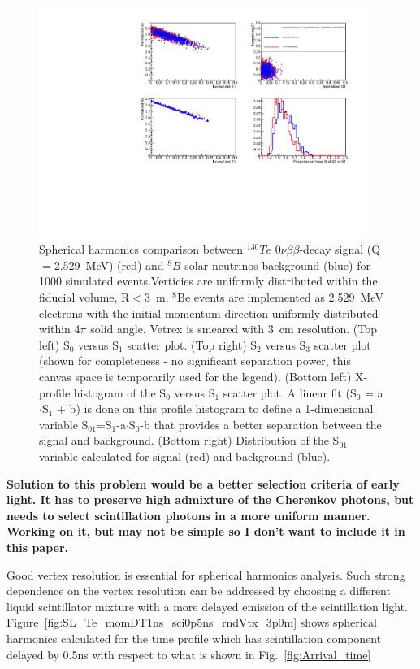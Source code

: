 \documentclass[12pt,twoside,letterpaper]{article}
\newcommand{\vbb}{0\nu\beta\beta}
\newcommand{\Te}{^{130}Te}
\newcommand{\B}{^{8}B}
\begin{document}
\begin{figure}[htb]
\centering
\includegraphics[angle=0,width=0.95\textwidth]{plots/hSLPlots_Te_allLight_VtxSmear3cm_VtxShiftX0cm_momDT1p0ns_rndVtx_3p0mSphere.pdf}
\caption{Spherical harmonics comparison between $\Te$ $\vbb$-decay signal (Q$=$2.529~MeV) (red) and $\B$ solar neutrinos background (blue) for 1000 simulated events.Verticies are uniformly distributed within the fiducial volume, R$<$3~m. $^8$Be events are implemented as 2.529~MeV electrons with the initial momentum direction uniformly distributed within 4$\pi$ solid angle. Vetrex is smeared with 3~cm resolution. (Top left) S$_0$ versus S$_1$ scatter plot. (Top right) S$_2$ versus S$_3$ scatter plot (shown for completeness - no significant separation power, this canvas space is temporarily used for the legend). (Bottom left) X-profile histogram of the S$_0$ versus S$_1$ scatter plot. A linear fit (S$_0$ = a$\cdot$S$_1$ + b) is done on this profile histogram to define a 1-dimensional variable S$_{01}$=S$_1$-a$\cdot$S$_0$-b that provides a better separation between the signal and background. (Bottom right) Distribution of the S$_{01}$ variable calculated for signal (red) and background (blue).}
\label{fig:SL_Te_SmearX3cm_momDT1ns_rndVtx_3p0m}
\end{figure}


{\bf Solution to this problem would be a better selection criteria of early light. It has to preserve high admixture of the Cherenkov photons, but needs to select scintillation photons in a more uniform manner. Working on it, but may not be simple so I don't want to include it in this paper.}

Good vertex resolution is essential for spherical harmonics analysis. Such strong dependence on the vertex resolution can be addressed by choosing a different liquid scintillator mixture with a more delayed emission of the scintillation  light. Figure~\ref{fig:SL_Te_momDT1ns_sci0p5ns_rndVtx_3p0m} shows spherical harmonics calculated for the time profile which has scintillation component delayed by 0.5ns with respect to what is shown in Fig.~\ref{fig:Arrival_time}
\end{document}
